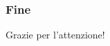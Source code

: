 \begin{frame}
  \frametitle{Fine}
  \begin{center}
    \LARGE Grazie per l'attenzione!
  \end{center}
\end{frame}
